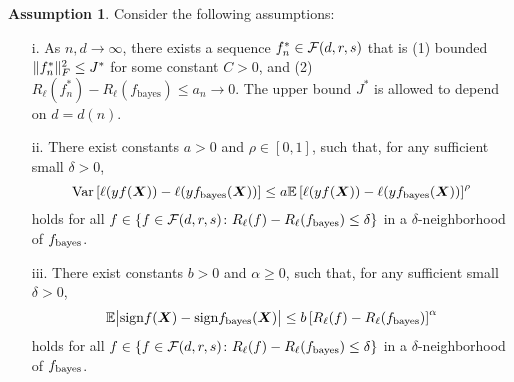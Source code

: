 \documentclass[11pt]{article}
\theoremstyle{definition}
\newtheorem{ass}{Assumption}
\newtheorem{rmk}{Remark}
\def\sign{\textup{sgn}}
\def\sign{\textup{sign}}
\def\bayesf{f_{\textup{bayes}}}
\begin{document}
\begin{ass}\label{ass:main} Consider the following assumptions:
\begin{enumerate}
\item[i.] As $n,d\to \infty$, there exists a sequence $f_n^*\in\mathcal{F}(d,r,s)$ that is (1) bounded $\lVert f^*_n\rVert_F^2\leq J^*$ for some constant $C>0$, and (2) $R_\ell(f_n^*)-R_\ell(f_{\text{bayes}})\leq a_n\to 0$. The upper bound $J^*$ is allowed to depend on $d=d(n)$. 

\item[ii.] There exist constants $a>0$ and $\rho\in[0,1]$, such that, for any sufficient small $\delta>0$,
\[
\text{Var}\left[\ell(yf(\mX))-\ell(y\bayesf(\mX))\right] \leq a \mathbb{E}\left[\ell(yf(\mX))-\ell(y\bayesf(\mX))\right]^\rho
\]
holds for all $f\in \{ f\in\tF(d,r,s)\colon R_\ell(f)-R_\ell(\bayesf) \leq \delta\}$ in a $\delta$-neighborhood of $\bayesf$. 

\item[iii.] There exist constants $b>0$ and $\alpha\geq 0$, such that, for any sufficient small $\delta>0$,
\[
\mathbb{E} \big|\sign  f (\mX)- \sign \bayesf(\mX)\big| \leq b\left[R_\ell(f)-R_\ell(\bayesf)\right]^\alpha
\]
holds for all $f\in \{ f\in\tF(d,r,s)\colon R_\ell(f)-R_\ell(\bayesf) \leq \delta\}$ in a $\delta$-neighborhood of $\bayesf$.
\end{enumerate}
\end{ass}

\end{document}
